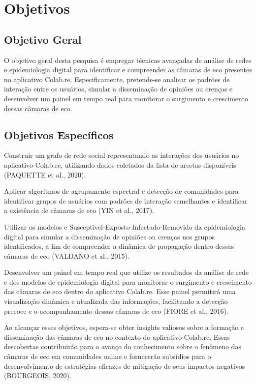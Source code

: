 \section{Objetivos}
\subsection{Objetivo Geral}
O objetivo geral desta pesquisa é empregar técnicas avançadas de análise de redes e epidemiologia digital para identificar e compreender as câmaras de eco presentes no aplicativo Colab.re. Especificamente, pretende-se analisar os padrões de interação entre os usuários, simular a disseminação de opiniões ou crenças e desenvolver um painel em tempo real para monitorar o surgimento e crescimento dessas câmaras de eco.
\subsection{Objetivos Específicos}
Construir um grafo de rede social representando as interações dos usuários no aplicativo Colab.re, utilizando dados coletados da lista de arestas disponíveis (PAQUETTE et al., 2020).

Aplicar algoritmos de agrupamento espectral e detecção de comunidades para identificar grupos de usuários com padrões de interação semelhantes e identificar a existência de câmaras de eco (YIN et al., 2017).

Utilizar os modelos  e  {Susceptível-Exposto-Infectado-Removido} da epidemiologia digital para simular a disseminação de opiniões ou crenças nos grupos identificados, a fim de compreender a dinâmica de propagação dentro dessas câmaras de eco (VALDANO et al., 2015).

Desenvolver um painel em tempo real que utilize os resultados da análise de rede e dos modelos de epidemiologia digital para monitorar o surgimento e crescimento das câmaras de eco dentro do aplicativo Colab.re. Esse painel permitirá uma visualização dinâmica e atualizada das informações, facilitando a detecção precoce e o acompanhamento dessas câmaras de eco (FIORE et al., 2016).

Ao alcançar esses objetivos, espera-se obter insights valiosos sobre a formação e disseminação das câmaras de eco no contexto do aplicativo Colab.re. Essas descobertas contribuirão para o avanço do conhecimento sobre o fenômeno das câmaras de eco em comunidades online e fornecerão subsídios para o desenvolvimento de estratégias eficazes de mitigação de seus impactos negativos (BOURGEOIS, 2020).

